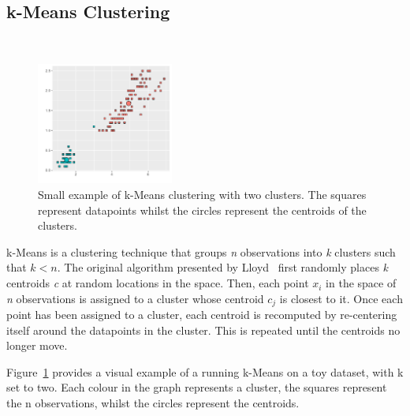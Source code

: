 \subsection{k-Means Clustering}~\label{sec:kMeans}
\vspace{-1em}
\begin{figure}[t]
    \centering
    \includegraphics[width=0.4\textwidth]{background/graphics/smallest_clust_example.pdf}
	\vspace{-1em}
    \caption{Small example of k-Means clustering with two clusters. The squares represent datapoints whilst the circles represent the centroids of the clusters.}
    \label{fig:kmeanex}
	\vspace{-1em}
\end{figure}

k-Means is a clustering technique that groups \textit{n} observations into \textit{k} clusters such that $k < n$.
The original algorithm presented by Lloyd~\cite{kMeans} first randomly places \textit{k} centroids \textit{c} at random locations in the space.
Then, each point \textit{$x_{i}$} in the space of \textit{n} observations is assigned to a cluster whose centroid \textit{$c_{j}$} is closest to it.
Once each point has been assigned to a cluster, each centroid is recomputed by re-centering itself around the datapoints in the cluster.
This is repeated until the centroids no longer move.
 
Figure~\ref{fig:kmeanex} provides a visual example of a running k-Means on a toy dataset, with k set to two.
Each colour in the graph represents a cluster, the squares represent the n observations, whilst the circles represent the centroids.
\vspace{-1em}
